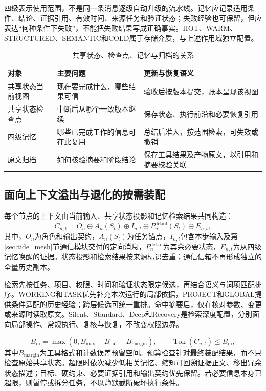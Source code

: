 四级表示使用范围，不是同一条消息逐级自动升级的流水线。记忆应记录适用条件、结论、证据引用、有效时间、来源任务和验证状态；失败经验也可保留，但应表达“何种条件下失败”，不能把失败结果写成正确事实。HOT、WARM、STRUCTURED、SEMANTIC和COLD属于存储介质，与上述作用域独立配置。

\begin{table}[htbp]
\centering
\caption{共享状态、检查点、记忆与归档的关系}
\label{tab:anchor_state_objects}
\begin{tabular}{p{}p{}p{}}
\toprule
对象 & 主要问题 & 更新与恢复语义 \\
\midrule
共享状态当前视图 & 现在要完成什么，哪些结果可信 & 验收后按版本提交，账本呈现该视图 \\
共享状态检查点 & 中断后从哪个一致版本继续 & 保存状态、执行前沿和必要恢复引用 \\
四级记忆 & 哪些已完成工作的信息可在此复用 & 总结后准入，按范围检索，可失效或撤销 \\
原文归档 & 如何核验摘要和阶段结论 & 保存工具结果及产物原文，以引用和摘要校验关联 \\
\bottomrule
\end{tabular}
\end{table}

\subsection{面向上下文溢出与退化的按需装配}

每个节点的上下文由当前输入、共享状态投影和记忆检索结果共同构造：
\begin{equation}
C_{n,t}=O_n\oplus A_n(S_t)\oplus I_{n,t}
\oplus P_n^{\mathrm{detail}}(S_t)\oplus E_{n,t},
\label{eq:anchor_context}
\end{equation}
其中，$O_n$为角色和输出契约，$A_n(S_t)$为任务锚点，$I_{n,t}$包含本步输入及第\ref{sec:tide_mesh}节通信模块交付的定向消息，$P_n^{\mathrm{detail}}$为其余必要状态，$E_{n,t}$为从四级记忆唤醒的证据。状态投影和检索结果按来源标识去重；通信信箱不再形成独立的全量历史副本。

检索先按任务、项目、权限、时间和验证状态限定候选，再结合语义与词项匹配排序。WORKING和TASK优先补充本次运行的局部依据，PROJECT和GLOBAL提供条件适配的历史经验；跨层候选可统一重排。命中摘要后，仅在核对参数、变更或来源时读取原文。Silent、Standard、Deep和Recovery是检索深度配置，分别面向局部操作、常规执行、复核与恢复，不改变权限边界。

\begin{equation}
B_{\mathrm{in}}=\max(0,B_{\mathrm{max}}-B_{\mathrm{out}}-B_{\mathrm{margin}}),
\qquad \operatorname{Tok}(C_{n,t})\leq B_{\mathrm{in}},
\label{eq:anchor_budget}
\end{equation}
其中$B_{\mathrm{margin}}$为工具格式和计数误差预留空间。预算检查针对最终装配结果，而不只检查原始共享状态。超限时依次减少低相关记忆、缩短可回溯证据正文、移出冗余状态描述；目标、硬约束、必要证据引用和输出契约优先保留。若必要信息本身已超限，则暂停或拆分任务，不以静默截断破坏执行条件。

